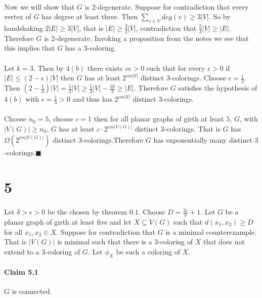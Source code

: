 \documentclass[letterpaper,12pt,oneside,onecolumn]{report}
\begin{document}
\paragraph{}
Now we will show that $G$ is $2$-degenerate. Suppose for contradiction that every vertex of $G$ has degree at least three. Then $\sum_{v\in V} deg(v) \geq 3|V|$. So by handshaking $2|E| \geq 3|V|$, that is $|E| \geq \frac{3}{2}|V|$, contradiction that $\frac{5}{3}|V| \geq |E|$. Therefore $G$ is $2$-degenerate. Invoking a proposition from the notes we see that this implies that $G$ has a $3$-coloring.
\paragraph{}
Let $k = 3$. Then by $4(b)$ there exists $m > 0$ such that for every $\epsilon > 0$ if $|E| \leq (2 - \epsilon)|V|$ then $G$ has at least $2^{\epsilon m |V|}$ distinct $3$-colorings. Choose $\epsilon = \frac{1}{3}$. Then $(2 - \frac{1}{3})|V| = \frac{5}{3}|V| \geq \frac{5}{3}|V| - \frac{10}{3} \geq |E|$. Therefore $G$ satisfies the hypothesis of $4(b)$ with $\epsilon = \frac{1}{3} > 0$ and thus has $2^{\epsilon m |V|}$ distinct $3$-colorings.
\paragraph{}
Choose $n_0 = 5$, choose $c = 1$ then for all planar graphs of girth at least $5$, $G$, with $|V(G)| \geq n_0$, $G$ has at least $c \cdot 2^{\epsilon m |V(G)|}$ distinct $3$-colorings. That is $G$ has $\Omega(2^{\epsilon m |V(G)|})$ distinct $3$-colorings.Therefore $G$ has exponentially many distinct $3$-colorings.$\blacksquare$

\section*{5}
\paragraph{}
Let $\delta > \epsilon > 0$ be the chosen by theorem $0.1$. Choose $D = \frac{2\epsilon}{\delta} + 1$. Let $G$ be a planar graph of girth at least five and let $X \subseteq V(G)$ such that $d(x_1, x_2) \geq D$ for all $x_1, x_2 \in X$. Suppose for contradiction that $G$ is a minimal counterexample. That is $|V(G)|$ is minimal such that there is a $3$-coloring of $X$ that does not extend to a $3$-coloring of $G$. Let $\phi_X$ be such a coloring of $X$.
\paragraph{Claim 5.1}
$G$ is connected.
\end{document}
